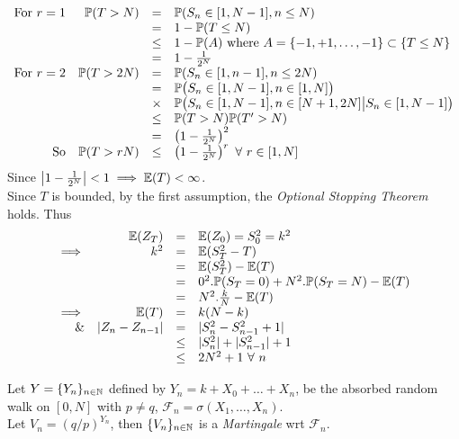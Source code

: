 \documentclass[11pt,a4paper]{article}
\begin{document}
\begin{enumerate}
	\[\begin{array}{rrcl}
	\mathrm{For\ }r=1&\prob(T>N)&=&\prob(S_n\in[1,N-1],n\leq N)\\
	&&=&1-\prob(T\leq N)\\
	&&\leq&1-\prob(A)\ \mathrm{where}\ A=\{-1,+1,\dots,-1\}\subset\{T\leq N\}\\
	&&=&1-\frac{1}{2^N}\\
	\mathrm{For\ }r=2&\prob(T>2N)&=&\prob(S_n\in[1,n-1],n\leq 2N)\\
	&&=&\prob\big(S_n\in[1,N-1],n\in[1,N]\big)\\
	&&\times&\prob\big(S_n\in[1,N-1],n\in[N+1,2N]\big|S_n\in[1,N-1]\big)\\
	&&\leq&\prob(T>N)\prob(T'>N)\\
	&&=&\left(1-\frac{1}{2^N}\right)^2\\
	\mathrm{So}&\prob(T>rN)&\leq&\left(1-\frac{1}{2^N}\right)^r\ \forall\ r\in[1,N]
	\end{array}\]
	Since $\left|1-\frac{1}{2^N}\right|<1\implies\mathbb{E}(T)<\infty$.\\
	Since $T$ is bounded, by the first assumption, the \textit{Optional Stopping Theorem} holds.
	Thus
	\[\begin{array}{rrcl}
	&\mathbb{E}(Z_T)&=&\mathbb{E}(Z_0)=S_0^2=k^2\\
	\implies&k^2&=&\mathbb{E}(S_T^2-T)\\
	&&=&\mathbb{E}(S_T^2)-\mathbb{E}(T)\\
	&&=&0^2.\mathbb{P}(S_T=0)+N^2.\mathbb{P}(S_T=N)-\mathbb{E}(T)\\
	&&=&N^2.\frac{k}{N}-\mathbb{E}(T)\\
	\implies&\mathbb{E}(T)&=&k(N-k)\\
	\&&|Z_n-Z_{n-1}|&=&|S_n^2-S_{n-1}^2+1|\\
	&&\leq&|S_n^2|+|S_{n-1}^2|+1\\
	&&\leq&2N^2+1\ \forall\ n
	\end{array}\]
\end{enumerate}

Let $Y=\{Y_n\}_{n\in\mathbb{N}}$ defined by $Y_n=k+X_0+\dots+X_n$, be the absorbed random walk on $[0,N]$ with $p\neq q$, $\mathcal{F}_n=\sigma(X_1,\dots,X_n)$.\\
Let $V_n=(q/p)^{Y_n}$, then $\{V_n\}_{n\in\mathbb{N}}$ is a \textit{Martingale} wrt $\mathcal{F}_n$.\\
\end{document}
